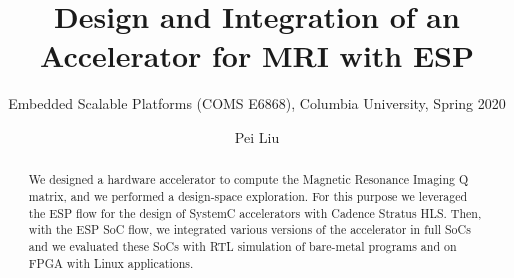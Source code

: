 \documentclass[sigconf, nonacm, screen]{acmart}
\begin{document}
\title{Design and Integration of an Accelerator for MRI with ESP}
\subtitle{Embedded Scalable Platforms (COMS E6868), Columbia University, Spring 2020}

\author{Pei Liu}

\begin{abstract}
We designed a hardware accelerator to compute the Magnetic Resonance Imaging Q
matrix, and we performed a design-space exploration. For this purpose we
leveraged the ESP flow for the design of SystemC accelerators with Cadence
Stratus HLS. Then, with the ESP SoC flow, we integrated various versions of the
accelerator in full SoCs and we evaluated these SoCs with RTL simulation of
bare-metal programs and on FPGA with Linux applications.
\end{abstract}

\maketitle













\end{document}
